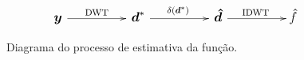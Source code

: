 \documentclass{article}
\begin{document}
	\begin{figure}[h]
		\[\large{
			\xymatrix@C+1cm{\boldsymbol y \, \ar[r]^-{\text{DWT}} & \, \boldsymbol{d}^* \, \ar[r]^{\delta(\boldsymbol{d}^*)} & \, {\boldsymbol{\hat d}} \, \ar[r]^{\text{IDWT}} & {\hat f}}
		}
		\]\vspace{-0.6cm}
		\caption{Diagrama do processo de estimativa da função.}
		\label{eq: diagrama do processo de shrinkage}
	\end{figure}
\end{document}
